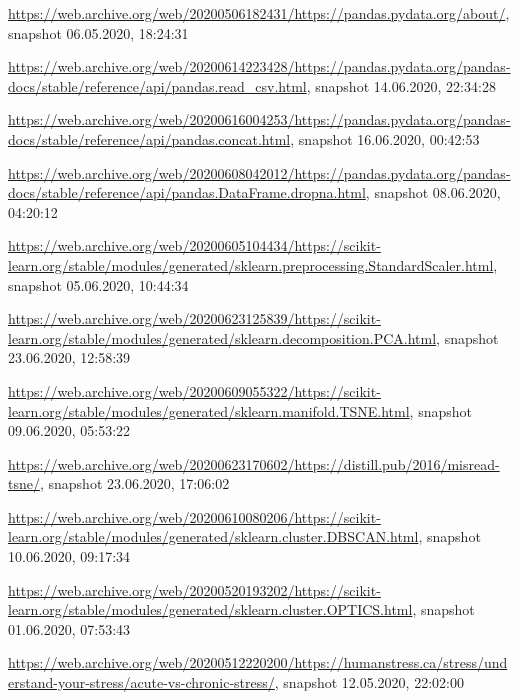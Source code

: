 \begin{appendices}
\url{https://web.archive.org/web/20200506182431/https://pandas.pydata.org/about/}, snapshot 06.05.2020, 18:24:31

\url{https://web.archive.org/web/20200614223428/https://pandas.pydata.org/pandas-docs/stable/reference/api/pandas.read_csv.html}, snapshot 14.06.2020, 22:34:28

\url{https://web.archive.org/web/20200616004253/https://pandas.pydata.org/pandas-docs/stable/reference/api/pandas.concat.html}, snapshot 16.06.2020, 00:42:53

\url{https://web.archive.org/web/20200608042012/https://pandas.pydata.org/pandas-docs/stable/reference/api/pandas.DataFrame.dropna.html}, snapshot 08.06.2020, 04:20:12

\url{https://web.archive.org/web/20200605104434/https://scikit-learn.org/stable/modules/generated/sklearn.preprocessing.StandardScaler.html}, snapshot 05.06.2020, 10:44:34

\url{https://web.archive.org/web/20200623125839/https://scikit-learn.org/stable/modules/generated/sklearn.decomposition.PCA.html}, snapshot 23.06.2020, 12:58:39

\url{https://web.archive.org/web/20200609055322/https://scikit-learn.org/stable/modules/generated/sklearn.manifold.TSNE.html}, snapshot 09.06.2020, 05:53:22

\url{https://web.archive.org/web/20200623170602/https://distill.pub/2016/misread-tsne/}, snapshot 23.06.2020, 17:06:02

\url{https://web.archive.org/web/20200610080206/https://scikit-learn.org/stable/modules/generated/sklearn.cluster.DBSCAN.html}, snapshot 10.06.2020, 09:17:34

\url{https://web.archive.org/web/20200520193202/https://scikit-learn.org/stable/modules/generated/sklearn.cluster.OPTICS.html}, snapshot 01.06.2020, 07:53:43

\url{https://web.archive.org/web/20200512220200/https://humanstress.ca/stress/understand-your-stress/acute-vs-chronic-stress/}, snapshot 12.05.2020, 22:02:00



\end{appendices}
